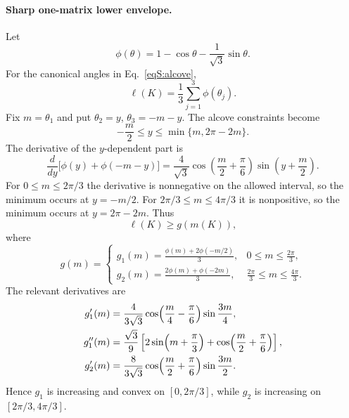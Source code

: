 \documentclass[aps,prl,reprint,superscriptaddress,nofootinbib]{revtex4-2}
\begin{document}
\paragraph{Sharp one-matrix lower envelope.}
Let
\begin{equation}
\phi(\theta)=1-\cos\theta-\frac1{\sqrt3}\sin\theta.
\label{eqS:phi}
\end{equation}
For the canonical angles in Eq.~\eqref{eqS:alcove},
\begin{equation}
\ell(K)=\frac13\sum_{j=1}^{3}\phi(\theta_j).
\label{eqS:ellangles}
\end{equation}
Fix $m=\theta_1$ and put $\theta_2=y$, $\theta_3=-m-y$. The alcove constraints become
\begin{equation}
-\frac m2\leq y\leq\min\{m,2\pi-2m\}.
\label{eqS:yint}
\end{equation}
The derivative of the $y$-dependent part is
\begin{equation}
\frac{d}{dy}\bigl[\phi(y)+\phi(-m-y)\bigr]
=\frac4{\sqrt3}\cos\!\left(\frac m2+\frac\pi6\right)
\sin\!\left(y+\frac m2\right).
\label{eqS:yder}
\end{equation}
For $0\leq m\leq2\pi/3$ the derivative is nonnegative on the allowed interval, so the minimum occurs at $y=-m/2$. For $2\pi/3\leq m\leq4\pi/3$ it is nonpositive, so the minimum occurs at $y=2\pi-2m$. Thus
\begin{equation}
\ell(K)\geq g(m(K)),
\label{eqS:ellg}
\end{equation}
where
\begin{equation}
g(m)=
\begin{cases}
\displaystyle g_1(m)=\frac{\phi(m)+2\phi(-m/2)}{3},
&0\leq m\leq\frac{2\pi}{3},\\[2mm]
\displaystyle g_2(m)=\frac{2\phi(m)+\phi(-2m)}{3},
&\frac{2\pi}{3}\leq m\leq\frac{4\pi}{3}.
\end{cases}
\label{eqS:g}
\end{equation}
The relevant derivatives are
\begin{align}
g_1'(m)&=\frac4{3\sqrt3}\cos\!\left(\frac m4-\frac\pi6\right)
\sin\frac{3m}{4},\notag\\
g_1''(m)&=\frac{\sqrt3}{9}\left[2\sin\!\left(m+\frac\pi3\right)
+\cos\!\left(\frac m2+\frac\pi6\right)\right],\notag\\
g_2'(m)&=\frac8{3\sqrt3}\cos\!\left(\frac m2+\frac\pi6\right)
\sin\frac{3m}{2}.
\label{eqS:gder}
\end{align}
Hence $g_1$ is increasing and convex on $[0,2\pi/3]$, while $g_2$ is increasing on $[2\pi/3,4\pi/3]$.
\end{document}
